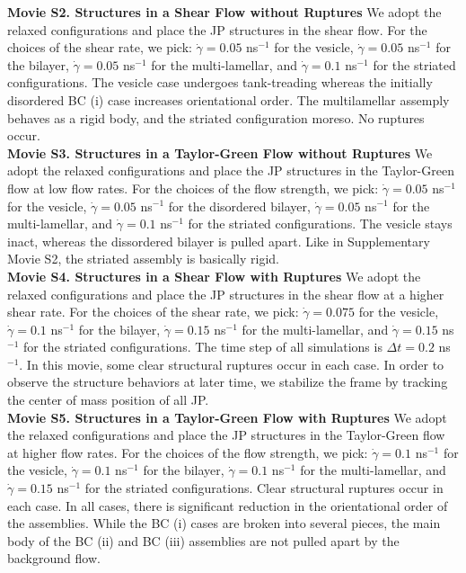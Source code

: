 \noindent
{\bf Movie S2. Structures in a Shear Flow without Ruptures} 
We adopt the relaxed configurations and place the JP structures in the
shear flow. For the choices of the shear rate, we pick: $\dot\gamma =
0.05$ ns$^{-1}$ for the vesicle, $\dot\gamma = 0.05$ ns$^{-1}$ for the bilayer, $\dot\gamma
= 0.05$ ns$^{-1}$ for the multi-lamellar, and $\dot\gamma = 0.1$ ns$^{-1}$ for the striated
configurations. The vesicle case undergoes tank-treading whereas the
initially disordered BC (i) case increases orientational order. The
multilamellar assemply behaves as a rigid body, and the striated
configuration moreso. No ruptures occur. \\



\noindent
{\bf Movie S3. Structures in a Taylor-Green Flow without Ruptures} 
We adopt the relaxed configurations and place the JP structures in the
Taylor-Green flow at low flow rates. For the choices of the flow
strength, we pick: $\dot\gamma = 0.05$ ns$^{-1}$ for the vesicle, $\dot\gamma = 0.05$ ns$^{-1}$ for the
disordered bilayer, $\dot\gamma = 0.05$ ns$^{-1}$ for the multi-lamellar, and $\dot\gamma = 0.1$ ns$^{-1}$
for the striated configurations. The vesicle stays inact, whereas the
dissordered bilayer is pulled apart. Like in Supplementary Movie S2, the
striated assembly is basically rigid. \\


\noindent
{\bf Movie S4. Structures in a Shear Flow with Ruptures} 
We adopt the relaxed configurations and place the JP structures in the
shear flow at a higher shear rate. For the choices of the shear rate, we
pick: $\dot\gamma = 0.075$ for the vesicle, $\dot\gamma = 0.1$ ns$^{-1}$ for the
bilayer, $\dot\gamma = 0.15$ ns$^{-1}$ for the multi-lamellar, and $\dot\gamma =
0.15$ ns$^{-1}$ for the striated configurations. The time step of all simulations
is $\Delta t=0.2$ ns$^{-1}$. In this movie, some clear structural ruptures occur
in each case. In order to observe the structure behaviors at later time,
we stabilize the frame by tracking the center of mass position of all
JP. \\


\noindent
{\bf Movie S5. Structures in a Taylor-Green Flow with Ruptures} 
We adopt the relaxed configurations and place the JP structures in the
Taylor-Green flow at higher flow rates. For the choices of the flow
strength, we pick: $\dot\gamma = 0.1$ ns$^{-1}$ for the vesicle, $\dot\gamma = 0.1$ ns$^{-1}$ for the
bilayer, $\dot\gamma = 0.1$ ns$^{-1}$ for the multi-lamellar, and $\dot\gamma = 0.15$ ns$^{-1}$ for the
striated configurations. Clear structural ruptures occur in each case.
In all cases, there is significant reduction in the orientational order
of the assemblies. While the BC (i) cases are broken into several
pieces, the main body of the BC (ii) and BC (iii) assemblies are not
pulled apart by the background flow.\\

